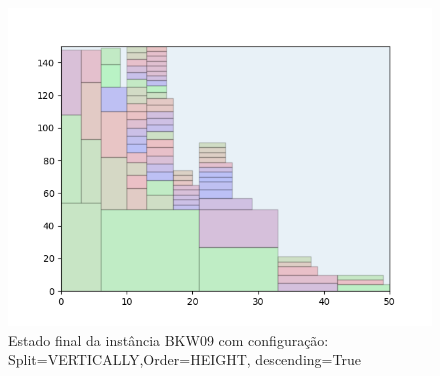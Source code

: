 \begin{figure}[H]
    \centering
    \caption[]{Estado final da instância BKW09 com configuração: Split=VERTICALLY,Order=HEIGHT, descending=True}
    \label{fig:bkw09-vertically-height-true}
    \includegraphics[scale=0.5]{output/figures/bkw/bkw09/vertically/height/true/000}
\end{figure}